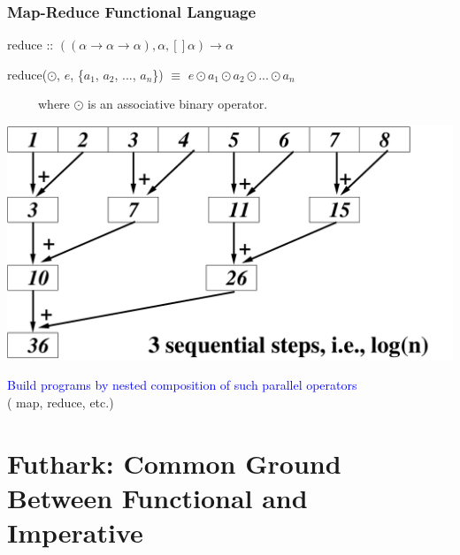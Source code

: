 \documentclass{beamer}
\newcommand{\blue}[1]{\textcolor{Blue}{{#1}}}
\renewcommand{\emph}[1]{\textcolor{structure}{#1}}
\newcommand{\emp}[1]{\textcolor{DikuRed}{ #1}}
\begin{document}
\begin{frame}[fragile,t]
   \frametitle{Map-Reduce Functional Language}

\bigskip

\emp{reduce} :: $((\alpha \rightarrow \alpha \rightarrow \alpha), \alpha, []\alpha) \rightarrow \alpha$

\smallskip

\emp{reduce}($\odot$, $e$, \{$a_1$, $a_2$, ..., $a_n$\}) $\equiv$ \emph{$e \odot a_1 \odot a_2 \odot ... \odot a_n$}

\smallskip

~~~~~where $\odot$ is an associative binary operator.

\bigskip

\begin{center} 
        \includegraphics[height=18ex]{Figures/ReduceEg.pdf} 
\end{center}\bigskip


\blue{Build programs by nested composition of such parallel operators}\\
(\emp{map}, \emp{reduce}, etc.)

\end{frame}


\section{Futhark: Common Ground Between Functional and Imperative}

\begin{frame}[fragile]
	\tableofcontents[currentsection]
\end{frame}
\end{document}
